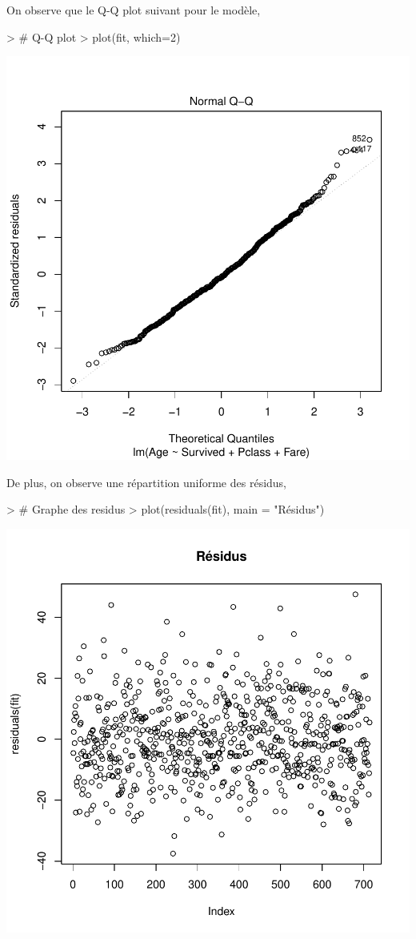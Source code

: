 \documentclass[11pt,french]{report}
\begin{document}
\bigskip
On observe que le Q-Q plot suivant pour le modèle,

\begin{Schunk}
\begin{Sinput}
> # Q-Q plot 
> plot(fit, which=2)
\end{Sinput}
\end{Schunk}
\includegraphics{notes_de_cours-041}

De plus, on observe une répartition uniforme des résidus,

\begin{Schunk}
\begin{Sinput}
> # Graphe des residus
> plot(residuals(fit), main = "Résidus")
\end{Sinput}
\end{Schunk}
\includegraphics{notes_de_cours-042}
\end{document}
